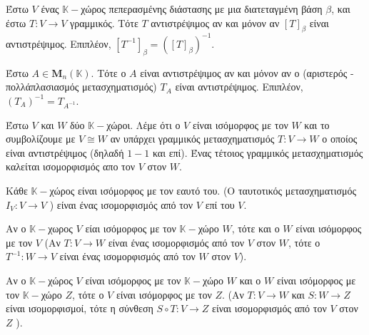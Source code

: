 



\pagestyle{vangelis}








\begin{cor}
  Έστω $V$ ένας $ \mathbb{K}- $χώρος πεπερασμένης διάστασης με μια διατεταγμένη 
  βάση $ \beta $, και έστω $ T \colon V \to V $ γραμμικός. Τότε $T$ αντιστρέψιμος 
  αν και μόνον αν $ [T]_{\beta} $ είναι αντιστρέψιμος. Επιπλέον, $ [T^{-1}]_{\beta} = 
  ([T]_{\beta })^{-1}$.
\end{cor}

\begin{cor}
  Έστω $ A \in \textbf{M}_{n}(\mathbb{K})  $. Τότε ο $A$ είναι αντιστρέψιμος αν και 
  μόνον αν ο (αριστερός - πολλάπλασιασμός μετασχηματισμός) $ T_{A} $ είναι 
  αντιστρέψιμος. Επιπλέον, $ (T_{Α})^{-1} = T_{A^{-1}} $.
\end{cor}

\begin{dfn}
  Έστω $V$ και $W$ δύο $ \mathbb{K}- $χώροι. Λέμε ότι ο $V$ είναι ισόμορφος με τον 
  $W$ και το συμβολίζουμε με $ V \cong W $ αν υπάρχει γραμμικός μετασχηματισμός 
  $ T \colon V \to W $ ο οποίος είναι αντιστρέψιμος (δηλαδή $ 1-1 $ και επί). Ένας 
  τέτοιος γραμμικός μετασχηματισμός καλείται ισομορφισμός απο τον $V$ στον $W$.
\end{dfn}

\begin{rem}
  Κάθε $ \mathbb{K}- $χώρος είναι ισόμορφος με τον εαυτό του. (Ο ταυτοτικός 
  μετασχηματισμός $ I_{V} \colon V \to V $ ) είναι ένας ισομορφισμός από τον $V$ επί 
  του $V$.
\end{rem}

\begin{rem}
  Αν ο $ \mathbb{K}- $χωρος $V$ είαι ισόμορφος με τον $ \mathbb{K}- $χώρο $W$, τότε 
  και ο $W$ είναι ισόμορφος με τον $V$ (Αν $ T \colon V \to W $ είναι ένας ισομορφισμός 
  από τον $V$ στον $W$, τότε ο $ T^{-1} \colon W \to V $ είναι ένας ισομορφισμός από 
  τον $W$ στον $V$). 
\end{rem}

\begin{rem}
  Αν ο $ \mathbb{K}- $χώρος $V$ είναι ισόμορφος με τον $ \mathbb{K}- $χώρο $W$ και ο 
  $W$ είναι ισόμορφος με τον $ \mathbb{K}- $χώρο $Z$, τότε ο $V$ είναι ισόμορφος με 
  τον $Z$. (Αν $ T \colon V \to W $ και $ S \colon W\to Z $ είναι ισομορφισμοί, τότε 
  η σύνθεση $ S \circ T \colon V \to Z$ είναι ισομορφισμός από τον $V$ στον $ Z $ ).
\end{rem}

